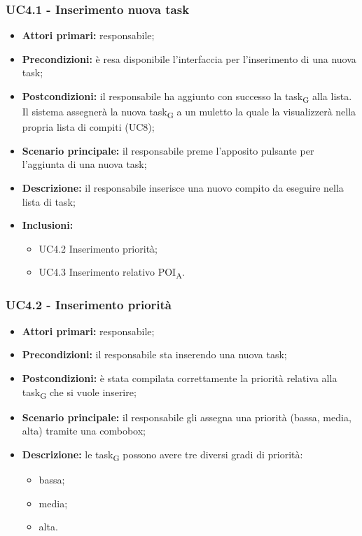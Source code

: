 \subsubsection{UC4.1 - Inserimento nuova task}

\begin{itemize}
	\item 	\textbf{Attori primari:} responsabile;
	\item 	\textbf{Precondizioni:} è resa disponibile l’interfaccia per l’inserimento di una nuova task;
	\item 	\textbf{Postcondizioni:} il responsabile ha aggiunto con successo la \gls{task}\textsubscript{G} alla lista. Il sistema assegnerà la nuova \gls{task}\textsubscript{G} a un muletto la quale la visualizzerà nella propria lista di compiti (UC8);
	\item 	\textbf{Scenario principale:} il responsabile preme l’apposito pulsante per l’aggiunta di una nuova task; 
	\item 	\textbf{Descrizione:} il responsabile inserisce una nuovo compito da eseguire nella lista di task;
	\item 	\textbf{Inclusioni:}
	\begin{itemize}
		\item UC4.2 Inserimento priorità;
		\item UC4.3 Inserimento relativo \acrshort{POI}\textsubscript{A}.
	\end{itemize}
\end{itemize}

\subsubsection{UC4.2 - Inserimento priorità}

\begin{itemize}
	\item 	\textbf{Attori primari:} responsabile;
	\item 	\textbf{Precondizioni:} il responsabile sta inserendo una nuova task;
	\item 	\textbf{Postcondizioni:} è stata compilata correttamente la priorità relativa alla \gls{task}\textsubscript{G} che si vuole inserire;
	\item 	\textbf{Scenario principale:} il responsabile gli assegna una priorità (bassa, media, alta) tramite una combobox;
	\item 	\textbf{Descrizione:} le \gls{task}\textsubscript{G} possono avere tre diversi gradi di priorità:
	\begin{itemize}
		\item bassa;
		\item media;
		\item alta.
	\end{itemize}
\end{itemize}

